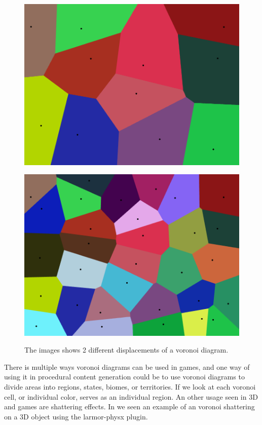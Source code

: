 \begin{figure}[H]
	\begin{minipage}[b]{.48\linewidth}
		\includegraphics[width=0.95\linewidth]{img/VoronoiDiagramSmall}
		\label{fig:2a}
	\end{minipage}
	\begin{minipage}[b]{.48\linewidth}
		\includegraphics[width=0.95\linewidth]{img/VoronoiDiagramBig}
		\label{fig:2b}
	\end{minipage}
		\centering
		\caption{The images shows 2 different displacements of a voronoi diagram.}
		\label{fig:Voronoi}
\end{figure}

There is multiple ways voronoi diagrams can be used in games, and one way of using it in procedural content generation could be to use voronoi diagrams to divide areas into regions, states, biomes, or territories. If we look at  each voronoi cell, or individual color, serves as an individual region. An other usage seen in 3D and games are shattering effects. In  we seen an example of an voronoi shattering on a 3D object using the larmor-physx\cite{larmor-physx} plugin.

